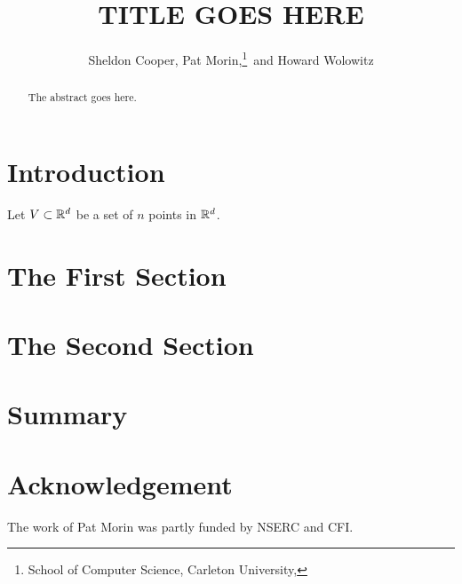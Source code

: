 \documentclass{patmorin}
\title{\MakeUppercase{Title Goes Here}}
\author{Sheldon Cooper, Pat Morin,\thanks{School of Computer Science, Carleton University, \email{morin@scs.carleton.ca}}\ and Howard Wolowitz}
\begin{document}
\maketitle

\begin{abstract}
  The abstract goes here.
\end{abstract}

\section{Introduction}


Let $V\subset \mathbb{R}^d$ be a set of $n$ points in $\mathbb{R}^d$. 

\section{The First Section}

\section{The Second Section}

\section{Summary}

\section*{Acknowledgement}

The work of Pat Morin was partly funded by NSERC and CFI.



\end{document}
